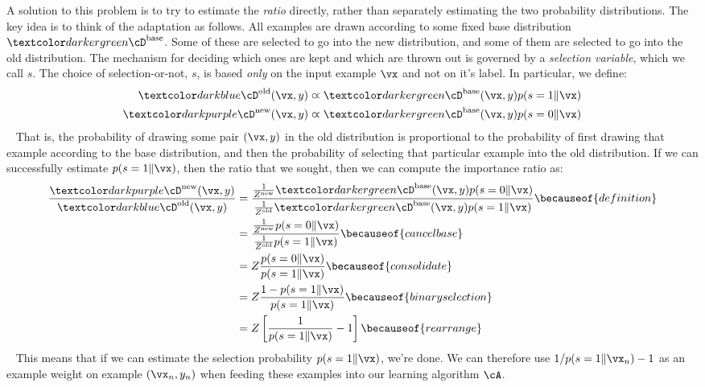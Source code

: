 A solution to this problem is to try to estimate the \emph{ratio} directly, rather than separately estimating the two probability distributions.
The key idea is to think of the adaptation as follows.
All examples are drawn according to some fixed base distribution $\Dbase$.
Some of these are selected to go into the new distribution, and some of them are selected to go into the old distribution.
The mechanism for deciding which ones are kept and which are thrown out is governed by a \emph{selection variable}, which we call $s$.
The choice of selection-or-not, $s$, is based \emph{only} on the input example $\vx$ and not on it's label.
In particular, we define:
~
\begin{align}
\Dold(\vx,y) &\varpropto \Dbase(\vx,y) p(s=1 \| \vx) \\
\Dnew(\vx,y) &\varpropto \Dbase(\vx,y) p(s=0 \| \vx)
\end{align}
~
That is, the probability of drawing some pair $(\vx,y)$ in the old distribution is proportional to the probability of first drawing that example according to the base distribution, and then the probability of selecting that particular example into the old distribution.
If we can successfully estimate $p(s=1 \| \vx)$, then the ratio that we sought, then we can compute the importance ratio as:
~
\begin{align}
\frac {\Dnew(\vx,y)} {\Dold(\vx,y)}
&= \frac { \frac 1 {Z^{\text{new}}} \Dbase(\vx,y) p(s=0 \| \vx) }
         { \frac 1 {Z^{\text{old}}} \Dbase(\vx,y) p(s=1 \| \vx) }
  \becauseof{definition} \\
&= \frac { \frac 1 {Z^{\text{new}}} p(s=0 \| \vx) }
         { \frac 1 {Z^{\text{old}}} p(s=1 \| \vx) }
  \becauseof{cancel base} \\
&= Z \frac { p(s=0 \| \vx) } { p(s=1 \| \vx) }
  \becauseof{consolidate} \\
&= Z \frac { 1 - p(s=1 \| \vx) } { p(s=1 \| \vx) }
  \becauseof{binary selection} \\
&= Z \left[ \frac 1 {p(s=1 \| \vx)} - 1 \right]
  \becauseof{rearrange}
\end{align}
~
This means that if we can estimate the selection probability $p(s=1\|\vx)$, we're done.
We can therefore use $1 / p(s=1 \| \vx_n) - 1$ as an example weight on example $(\vx_n, y_n)$ when feeding these examples into our learning algorithm $\cA$.

